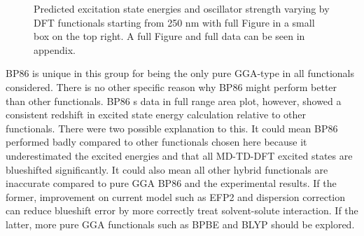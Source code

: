\documentclass[
journal=jpcbfk, %
manuscript=article]{achemso}
\begin{document}
	\begin{figure}[htb]
		\centering
		\begin{subfigure}[b]{0.48\textwidth}
			\caption{}
			\label{fig:aniline_zoom)}
		\end{subfigure}
		\begin{subfigure}[b]{0.48\textwidth}
			\caption{}
			\label{fig:3F_zoom)}
		\end{subfigure}
		\begin{subfigure}[b]{0.48\textwidth}
			\caption{}
			\label{fig:4F_zoom)}
		\end{subfigure}
		\begin{subfigure}[b]{0.48\textwidth}
			\caption{}
			\label{fig:3Cl_zoom)}
		\end{subfigure}
		\begin{subfigure}[b]{0.48\textwidth}
			\caption{}
			\label{fig:4MeOacetophenone_zoom)}
		\end{subfigure}
		\begin{subfigure}[b]{0.48\textwidth}
			\caption{}
			\label{fig:1_3_zoom)}
		\end{subfigure}
		\caption{Predicted excitation state energies and oscillator strength varying by DFT functionals starting from 250 nm with full Figure in a small box on the top right. A full Figure and full data can be seen in appendix.}\label{fig:TDDFTbyFunctionals_zoom}
	\end{figure}
	BP86 is unique in this group for being the only pure GGA-type in all functionals considered. There is no other specific reason why BP86 might perform better than other functionals. BP86 s data in full range area plot, however, showed a consistent redshift in excited state energy calculation relative to other functionals. There were two possible explanation to this. It could mean BP86 performed badly compared to other functionals chosen here because it underestimated the excited energies and that all MD-TD-DFT excited states are blueshifted significantly. It could also mean all other hybrid functionals are inaccurate compared to pure GGA BP86 and the experimental results. If the former, improvement on current model such as EFP2\cite{Gordon2001} and dispersion correction\cite{Guidez2015} can reduce blueshift error by more correctly treat solvent-solute interaction. If the latter, more pure GGA functionals such as BPBE\cite{Perdew1996,Becke1988} and BLYP\cite{Becke1988,Lee1988} should be explored.
	
\end{document}
